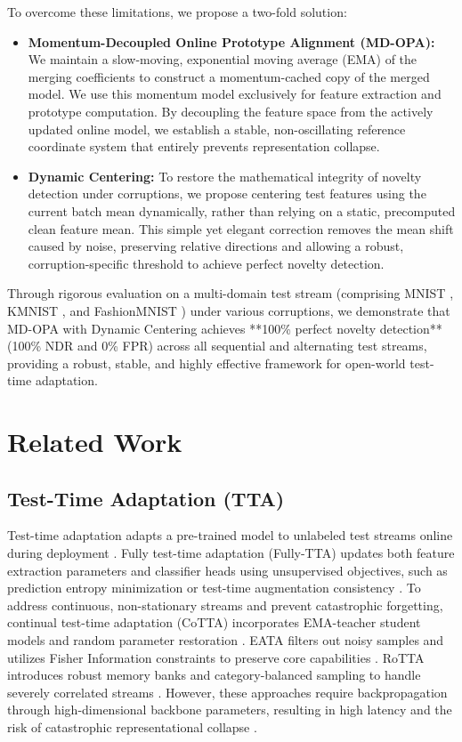 \documentclass{article}
\theoremstyle{plain}
\theoremstyle{definition}
\theoremstyle{remark}
\begin{document}
To overcome these limitations, we propose a two-fold solution:
\begin{itemize}
    \item \textbf{Momentum-Decoupled Online Prototype Alignment (MD-OPA):} We maintain a slow-moving, exponential moving average (EMA) of the merging coefficients to construct a momentum-cached copy of the merged model. We use this momentum model exclusively for feature extraction and prototype computation. By decoupling the feature space from the actively updated online model, we establish a stable, non-oscillating reference coordinate system that entirely prevents representation collapse.
    \item \textbf{Dynamic Centering:} To restore the mathematical integrity of novelty detection under corruptions, we propose centering test features using the current batch mean dynamically, rather than relying on a static, precomputed clean feature mean. This simple yet elegant correction removes the mean shift caused by noise, preserving relative directions and allowing a robust, corruption-specific threshold to achieve perfect novelty detection.
\end{itemize}

Through rigorous evaluation on a multi-domain test stream (comprising MNIST \cite{lecun1998gradient}, KMNIST \cite{clanuwat2018deep}, and FashionMNIST \cite{xiao2017fashionmnist}) under various corruptions, we demonstrate that MD-OPA with Dynamic Centering achieves **100\% perfect novelty detection** (100\% NDR and 0\% FPR) across all sequential and alternating test streams, providing a robust, stable, and highly effective framework for open-world test-time adaptation.

\section{Related Work}

\subsection{Test-Time Adaptation (TTA)}
Test-time adaptation adapts a pre-trained model to unlabeled test streams online during deployment \cite{wang2021tent}. Fully test-time adaptation (Fully-TTA) updates both feature extraction parameters and classifier heads using unsupervised objectives, such as prediction entropy minimization \cite{wang2021tent} or test-time augmentation consistency \cite{zhang2022memo}. To address continuous, non-stationary streams and prevent catastrophic forgetting, continual test-time adaptation (CoTTA) incorporates EMA-teacher student models and random parameter restoration \cite{wang2022continual}. EATA filters out noisy samples and utilizes Fisher Information constraints to preserve core capabilities \cite{niu2022efficient}. RoTTA introduces robust memory banks and category-balanced sampling to handle severely correlated streams \cite{yuan2023rotta}. However, these approaches require backpropagation through high-dimensional backbone parameters, resulting in high latency and the risk of catastrophic representational collapse \cite{liang2023comprehensive}.
\end{document}
